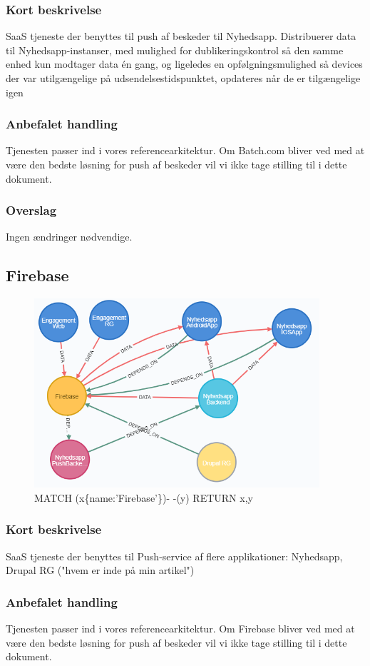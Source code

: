 \documentclass{article}
\begin{document}
\subsubsection{Kort beskrivelse}
SaaS tjeneste der benyttes til push af beskeder til Nyhedsapp.
Distribuerer data til Nyhedsapp-instanser, med mulighed for dublikeringskontrol så den samme enhed kun modtager data én gang, og ligeledes en opfølgningsmulighed så devices der var utilgængelige på udsendelsestidspunktet, opdateres når de er tilgængelige igen
\subsubsection{Anbefalet handling}
Tjenesten passer ind i vores referencearkitektur. Om Batch.com bliver ved med at være den bedste løsning for push af beskeder vil vi ikke tage stilling til i dette dokument.
\subsubsection{Overslag}
Ingen ændringer nødvendige.


\subsection{Firebase}
\begin{figure}[h]
\includegraphics[width=300pt]{Firebase.PNG}
\caption{MATCH (x\{name:'Firebase'\})- -(y) RETURN x,y}
\end{figure}
\subsubsection{Kort beskrivelse}
SaaS tjeneste der benyttes til Push-service af flere applikationer:
Nyhedsapp, Drupal RG ("hvem er inde på min artikel")
\subsubsection{Anbefalet handling}
Tjenesten passer ind i vores referencearkitektur. Om Firebase bliver ved med at være den bedste løsning for push af beskeder vil vi ikke tage stilling til i dette dokument.
\end{document}
